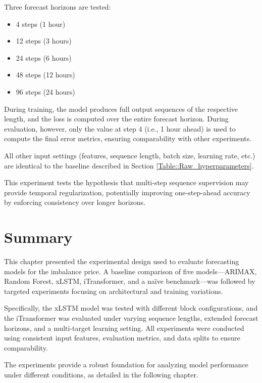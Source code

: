 \documentclass[class=scrbook, crop=false]{standalone}
\begin{document}
Three forecast horizons are tested:
\begin{itemize}
\item 4 steps (1 hour)
\item 12 steps (3 hours)
\item 24 steps (6 hours)
\item 48 steps (12 hours)
\item 96 steps (24 hours)
\end{itemize}

During training, the model produces full output sequences of the respective length, and the loss is computed over the entire forecast horizon. During evaluation, however, only the value at step 4 (i.e., 1 hour ahead) is used to compute the final error metrics, ensuring comparability with other experiments.

All other input settings (features, sequence length, batch size, learning rate, etc.) are identical to the baseline described in Section \ref{Table::Raw_hyperparameters}.

This experiment tests the hypothesis that multi-step sequence supervision may provide temporal regularization, potentially improving one-step-ahead accuracy by enforcing consistency over longer horizons.

\section{Summary}
This chapter presented the experimental design used to evaluate forecasting models for the imbalance price. A baseline comparison of five models—ARIMAX, Random Forest, xLSTM, iTransformer, and a naïve benchmark—was followed by targeted experiments focusing on architectural and training variations.

Specifically, the xLSTM model was tested with different block configurations, and the iTransformer was evaluated under varying sequence lengths, extended forecast horizons, and a multi-target learning setting. All experiments were conducted using consistent input features, evaluation metrics, and data splits to ensure comparability.

The experiments provide a robust foundation for analyzing model performance under different conditions, as detailed in the following chapter.
\end{document}
